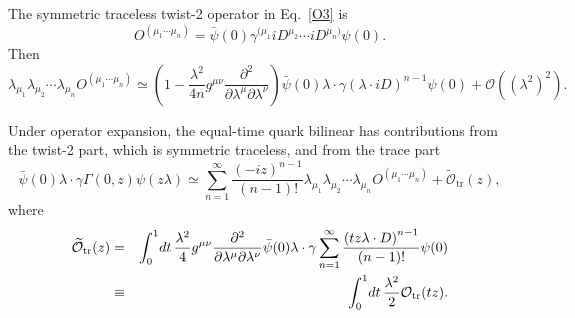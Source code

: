 
The symmetric traceless twist-2 operator in Eq.~\ref{O3} is
%
\begin{equation}
O^{(\mu_1\cdots \mu_n)} =
  \bar{\psi}(0)\gamma^{(\mu_1} iD^{\mu_2} \cdots iD^{\mu_n)} \psi(0).
\end{equation}
%
Then
%
\begin{equation}
\lambda_{\mu_1}\lambda_{\mu_2}\cdots \lambda_{\mu_n} O^{(\mu_1\cdots \mu_n)} \simeq
  \left(1-\frac{\lambda^2}{4n} g^{\mu\nu}
    \frac{\partial^2}{\partial \lambda^\mu \partial \lambda^\nu} \right)
  \bar{\psi}(0) \lambda \cdot \gamma \left( \lambda \cdot iD \right)^{n-1} \psi(0)
  + \mathcal{O}\left(\left( \lambda^2\right)^2\right).  \label{trace}
\end{equation}

Under operator expansion, the equal-time quark bilinear has
contributions from the twist-2 part, which is symmetric traceless, and from
the trace part
%
\begin{equation}
\bar{\psi}(0)\lambda \cdot \gamma \Gamma \left( 0,z \right) \psi (z\lambda )
  \simeq \sum_{n=1}^\infty \frac{\left(-iz\right)^{n-1}}{\left(n-1\right)!}
    \lambda_{\mu_1}\lambda_{\mu_2} \cdots \lambda_{\mu_n} O^{(\mu_1\cdots \mu_n)}
    + \widetilde{\mathcal{O}}_\text{tr}(z),
\end{equation}
%
where
%
\begin{eqnarray}
\widetilde{\mathcal{O}}_\text{tr}(z) &=& 
  \int_0^1 \!dt\,\frac{\lambda^2}{4} g^{\mu\nu}
    \frac{\partial^2}{\partial \lambda^\mu \partial \lambda^\nu}
    \bar{\psi}(0) \lambda \cdot \gamma
      \sum_{n=1}^\infty \frac{\left(tz\lambda \cdot D\right)^{n-1}}
                             {\left(n-1\right)!}
    \psi(0)  \notag \\
  &\equiv& \int_0^1 \!dt\, \frac{\lambda^2}{2}\mathcal{O}_\text{tr}(tz).
\end{eqnarray}

